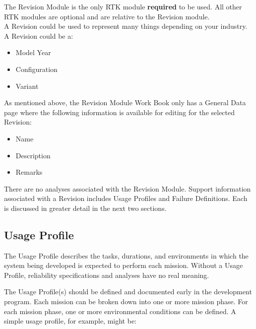\documentclass[twoside,12pt,letterpaper,openright]{book}
\begin{document}
\noindent The Revision Module is the only RTK module \textbf{required} to be
used.  All other RTK modules are optional and are relative to the Revision
module.
\\

\noindent A Revision could be used to represent many things depending on your industry.  A Revision could be a:

\begin{itemize}
	\item {Model Year}
	\item {Configuration}
	\item {Variant}
\end{itemize}

\noindent As mentioned above, the Revision Module Work Book only has a General
Data page where the following information is available for editing for the
selected Revision:

\begin{itemize}
    \item Name
    \item Description
    \item Remarks
\end{itemize}

\noindent There are no analyses associated with the Revision Module.  Support
information associated with a Revision includes Usage Profiles and Failure
Definitions.  Each is discussed in greater detail in the next two sections.
\\

\subsection{Usage Profile}

\noindent The Usage Profile describes the tasks, durations, and environments in
which the system being developed is expected to perform each mission.  Without
a Usage Profile, reliability specifications and analyses have no real meaning.


\noindent The Usage Profile(s) should be defined and documented early in the
development program.  Each mission can be broken down into one or more mission
phase.  For each mission phase, one or more environmental conditions can be
defined.  A simple usage profile, for example, might be:
\\

\end{document}
